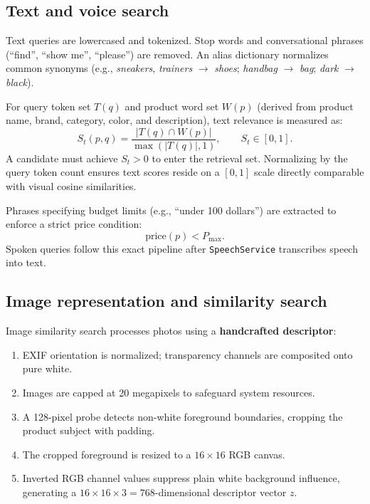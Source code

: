 \documentclass[12pt,a4paper]{article}
\newcommand{\code}[1]{\texttt{#1}}
\begin{document}
\subsection{Text and voice search}
Text queries are lowercased and tokenized. Stop words and conversational phrases (``find'', ``show me'', ``please'') are removed. An alias dictionary normalizes common synonyms (e.g., \textit{sneakers}, \textit{trainers} $\rightarrow$ \textit{shoes}; \textit{handbag} $\rightarrow$ \textit{bag}; \textit{dark} $\rightarrow$ \textit{black}).

For query token set $T(q)$ and product word set $W(p)$ (derived from product name, brand, category, color, and description), text relevance is measured as:
\begin{equation}
S_t(p,q) = \frac{|T(q) \cap W(p)|}{\max(|T(q)|, 1)}, \qquad S_t \in [0, 1].
\end{equation}
A candidate must achieve $S_t > 0$ to enter the retrieval set. Normalizing by the query token count ensures text scores reside on a $[0, 1]$ scale directly comparable with visual cosine similarities.

Phrases specifying budget limits (e.g., ``under 100 dollars'') are extracted to enforce a strict price condition:
\begin{equation}
\mathrm{price}(p) < P_{\max}.
\end{equation}
Spoken queries follow this exact pipeline after \code{SpeechService} transcribes speech into text.

\subsection{Image representation and similarity search}
Image similarity search processes photos using a \textbf{handcrafted descriptor}:
\begin{enumerate}
\item EXIF orientation is normalized; transparency channels are composited onto pure white.
\item Images are capped at 20 megapixels to safeguard system resources.
\item A 128-pixel probe detects non-white foreground boundaries, cropping the product subject with padding.
\item The cropped foreground is resized to a $16 \times 16$ RGB canvas.
\item Inverted RGB channel values suppress plain white background influence, generating a $16 \times 16 \times 3 = 768$-dimensional descriptor vector $z$.
\end{enumerate}
\end{document}
